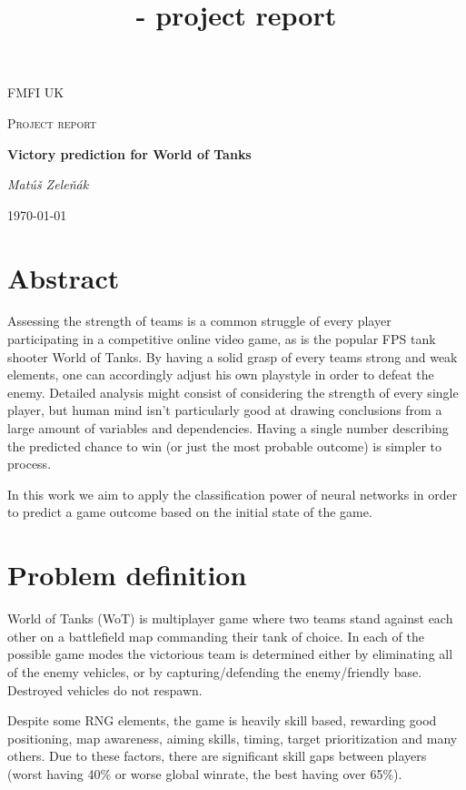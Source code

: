 \documentclass{report}
\begin{document}
\title{ - project report}
\begin{titlepage}
	\centering
	{\scshape\LARGE FMFI UK \par}
	\vspace{1cm}
	{\scshape\Large Project report\par}
	\vspace{1.5cm}
	{\huge\bfseries Victory prediction for World of Tanks\par}
	\vspace{2cm}
	{\Large\itshape Matúš Zeleňák\par}


	\vfill

	{\large \today\par}
\end{titlepage}

\section{Abstract}

Assessing the strength of teams is a common struggle of every player participating in a competitive online video game, as is the popular FPS tank shooter World of Tanks. By having a solid grasp of every teams strong and weak elements, one can accordingly adjust his own playstyle in order to defeat the enemy. Detailed analysis might consist of considering the strength of every single player, but human mind isn't particularly good at drawing conclusions from a large amount of variables and dependencies. Having a single number describing the predicted chance to win (or just the most probable outcome) is simpler to process.

In this work we aim to apply the classification power of neural networks in order to predict a game outcome based on the initial state of the game. 

\section{Problem definition}

World of Tanks (WoT) is multiplayer game where two teams stand against each other 
on a battlefield map commanding their tank of choice. In each of the possible game modes the victorious team is determined either by eliminating all of the enemy vehicles, or by capturing/defending the enemy/friendly base. Destroyed vehicles do not respawn.

Despite some RNG elements, the game is heavily skill based, rewarding good positioning, map awareness, aiming skills, timing, target prioritization and many others. Due to these factors, there are significant skill gaps between players (worst having 40\% or worse global winrate, the best having over 65\%). 
\end{document}
